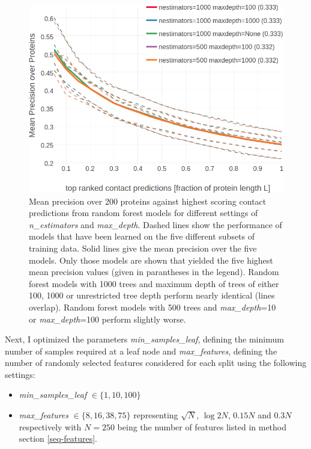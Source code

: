 \documentclass[11pt,a4paper,twoside]{book}
\providecommand{\tightlist}{%
  \setlength{\itemsep}{0pt}\setlength{\parskip}{0pt}}
\theoremstyle{definition}
\theoremstyle{definition}
\theoremstyle{remark}
\begin{document}
\begin{figure}

{\centering \includegraphics[width=0.9\linewidth]{img/random_forest_contact_prior/new_gridsearch/precision_vs_rank_cv_on_test_random_forest_nestimators_maxdepth_top5_notitle} 

}

\caption{Mean precision over
200 proteins against highest scoring contact predictions from random
forest models for different settings of \emph{n\_estimators} and
\emph{max\_depth}. Dashed lines show the performance of models that have
been learned on the five different subsets of training data. Solid lines
give the mean precision over the five models. Only those models are
shown that yielded the five highest mean precision values (given in
parantheses in the legend). Random forest models with 1000 trees and
maximum depth of trees of either 100, 1000 or unrestricted tree depth
perform nearly identical (lines overlap). Random forest models with 500
trees and \emph{max\_depth}=10 or \emph{max\_depth}=100 perform slightly
worse.}\label{fig:rf-gridsearch-nestimators-maxfeatures}
\end{figure}

Next, I optimized the parameters \emph{min\_samples\_leaf}, defining the
minimum number of samples required at a leaf node and
\emph{max\_features}, defining the number of randomly selected features
considered for each split using the following settings:

\begin{itemize}
\tightlist
\item
  \emph{min\_samples\_leaf} \(\in \{1, 10, 100\}\)
\item
  \emph{max\_features} \(\in \{8, 16, 38, 75 \}\) representing
  \(\sqrt{N}\), \(\log2{N}\), \(0.15N\) and \(0.3N\) respectively with
  \(N=250\) being the number of features listed in method section
  \ref{seq-features}.
\end{itemize}
\end{document}
